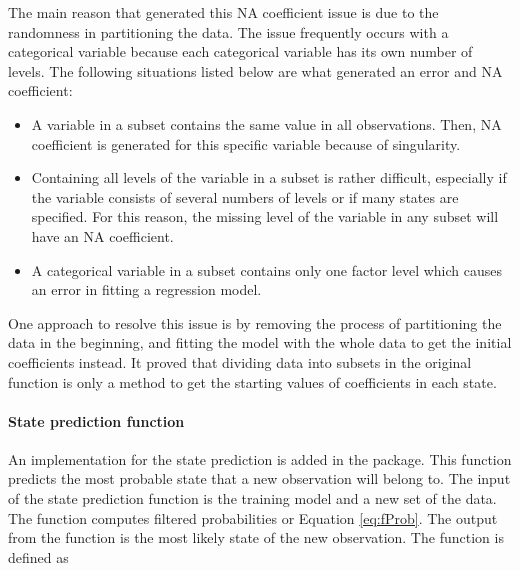 The main reason that generated this NA coefficient issue is due to
the randomness in partitioning the data. The issue frequently occurs
with a categorical variable because each categorical variable has
its own number of levels. The following situations listed below are
what generated an error and NA coefficient:
\begin{itemize}
\item A variable in a subset contains the same value in all observations.
Then, NA coefficient is generated for this specific variable because
of singularity.
\item Containing all levels of the variable in a subset is rather difficult,
especially if the variable consists of several numbers of levels or
if many states are specified. For this reason, the missing level of
the variable in any subset will have an NA coefficient. 
\item A categorical variable in a subset contains only one factor level
which causes an error in fitting a regression model.
\end{itemize}
One approach to resolve this issue is by removing the process of partitioning
the data in the beginning, and fitting the model with the whole data
to get the initial coefficients instead. It proved that dividing data
into subsets in the original function is only a method to get the
starting values of coefficients in each state. 

\paragraph{State prediction function}

An implementation for the state prediction is added in the package.
This function predicts the most probable state that a new observation
will belong to. The input of the state prediction function is the
training model and a new set of the data. The function computes filtered
probabilities or Equation \ref{eq:fProb}. The output from the function
is the most likely state of the new observation. The function is defined
as 


